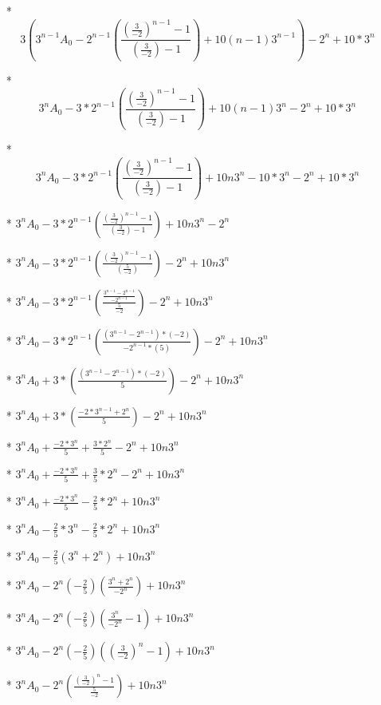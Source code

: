 \begin{enumerate}
\begin{enumerate}
\begin{itemize}
\begin{itemize}
      \item [*] $$3\left(3^{n-1}A_{0}-2^{n-1}\left(\frac{\left(\frac{3}{-2}\right)^{n-1}-1}{\left(\frac{3}{-2}\right)-1}\right)+10(n-1)3^{n-1}\right)-2^{n}+10*3^{n}$$
      \item [*] $$3^{n}A_{0}-3*2^{n-1}\left(\frac{\left(\frac{3}{-2}\right)^{n-1}-1}{\left(\frac{3}{-2}\right)-1}\right)+10(n-1)3^{n}-2^{n}+10*3^{n}$$
      \item [*] $$3^{n}A_{0}-3*2^{n-1}\left(\frac{\left(\frac{3}{-2}\right)^{n-1}-1}{\left(\frac{3}{-2}\right)-1}\right)+10n3^{n}-10*3^{n}-2^{n}+10*3^{n}$$
      \item [*] $3^{n}A_{0}-3*2^{n-1}\left(\frac{\left(\frac{3}{-2}\right)^{n-1}-1}{\left(\frac{3}{-2}\right)-1}\right)+10n3^{n}-2^{n}$
      \item [*] $3^{n}A_{0} -3*2^{n-1}\left(\frac{(\frac{3}{-2})^{n-1}-1}{(\frac{5}{-2})}\right)-2^{n}+10n3^{n}$
      \item [*] $3^{n}A_{0} -3*2^{n-1}\left(\frac{\frac{3^{n-1}-2^{n-1}}{-2^{n-1} }}{\frac{5}{-2}}\right)-2^{n}+10n3^{n}$
      \item [*] $3^{n}A_{0} -3*2^{n-1}\left(\frac{(3^{n-1}-2^{n-1})*(-2)}{-2^{n-1}*(5) }\right)-2^{n}+10n3^{n}$
      \item [*] $3^{n}A_{0} +3*\left(\frac{(3^{n-1}-2^{n-1})*(-2)}{5}\right)-2^{n}+10n3^{n}$
      \item [*] $3^{n}A_{0} +3*\left(\frac{-2*3^{n-1}+2^{n}}{5}\right)-2^{n}+10n3^{n}$
      \item [*] $3^{n}A_{0} +\frac{-2*3^{n}}{5} +\frac{3*2^{n}}{5}-2^{n}+10n3^{n}$
      \item [*] $3^{n}A_{0} +\frac{-2*3^{n}}{5} +\frac{3}{5}*2^{n}-2^{n}+10n3^{n}$
      \item [*] $3^{n}A_{0} +\frac{-2*3^{n}}{5} -\frac{2}{5}*2^{n}+10n3^{n}$
      \item [*] $3^{n}A_{0} -\frac{2}{5}*3^{n} -\frac{2}{5}*2^{n}+10n3^{n}$
      \item [*] $3^{n}A_{0} -\frac{2}{5}\left(3^{n}+2^{n}\right)+10n3^{n}$
      \item [*] $3^{n}A_{0} -2^{n}(-\frac{2}{5})\left(\frac{3^{n}+2^{n}}{-2^{n}}\right)+10n3^{n}$
      \item [*] $3^{n}A_{0} -2^{n}(-\frac{2}{5})\left(\frac{3^{n}}{-2^{n}}-1\right)+10n3^{n}$
      \item [*] $3^{n}A_{0} -2^{n}(-\frac{2}{5})\left(\left(\frac{3}{-2}\right)^{n}-1\right)+10n3^{n}$
      \item [*] $3^{n}A_{0} -2^{n}\left(\frac{\left(\frac{3}{-2}\right)^{n}-1}{\frac{5}{-2}}\right)+10n3^{n}$

\end{itemize}
\end{itemize}
\end{enumerate}
\end{enumerate}
